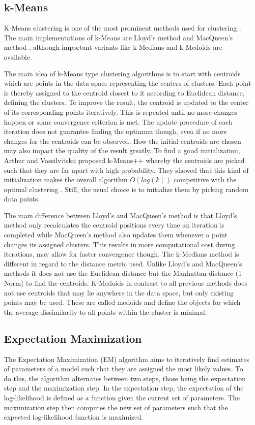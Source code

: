 \documentclass[
	a4paper,
	english,
	twoside,
	openright,               
	11pt                            
	]{report}
\begin{document}
\subsection{k-Means}
K-Means clustering is one of the most prominent methods used for clustering \cite{Jin2010}. The main implementations of k-Means are Lloyd's method \cite{4031353} and MacQueen's method \cite{macqueen1967}, although important variants like k-Medians \cite{Dohan2015KmedianAT} and k-Medoids \cite{kmedoids}  are available.

The main idea of k-Means type clustering algorithms is to start with centroids which are points in the data-space representing the centers of clusters. Each point is thereby assigned to the centroid closest to it according to Euclidean distance, defining the clusters. To improve the result, the centroid is updated to the center of its corresponding points iteratively. This is repeated until no more changes happen or some convergence criterion is met. The update procedure of each iteration does not guarantee finding the optimum though, even if no more changes for the centroids can be observed. How the initial centroids are chosen may also impact the quality of the result greatly. To find a good initialization, Arthur and Vassilvitskii \cite{10.5555/1283383.1283494} proposed k-Means++ whereby the centroids are picked such that they are far apart with high probability. They showed that this kind of initialization makes the overall algorithm $O(log(k))$ competitive with the optimal clustering \cite{10.5555/1283383.1283494}. Still, the usual choice is to initialize them by picking random data points.

The main difference between Lloyd's and MacQueen's method is that Lloyd's method only recalculates the centroid positions every time an iteration is completed while MacQueen's method also updates them whenever a point changes its assigned clusters. This results in more computational cost during iterations, may allow for faster convergence though. The k-Medians method is different in regard to the distance metric used. Unlike Lloyd's and MacQueen's methods it does not use the Euclidean distance but the Manhattan-distance (1-Norm) to find the centroids. K-Medoids in contrast to all previous methods does not use centroids that may lie anywhere in the data space, but only existing points may be used. These are called medoids and define the objects for which the average dissimilarity to all points within the cluster is minimal.

\subsection{Expectation Maximization}
The Expectation Maximization (EM) algorithm \cite{10.2307/2984875} aims to iteratively find estimates of parameters of a model such that they are assigned the most likely values. To do this, the algorithm alternates between two steps, those being the expectation step and the maximization step. In the expectation step, the expectation of the log-likelihood is defined as a function given the current set of parameters. The maximization step then computes the new set of parameters such that the expected log-likelihood function is maximized.
\end{document}
